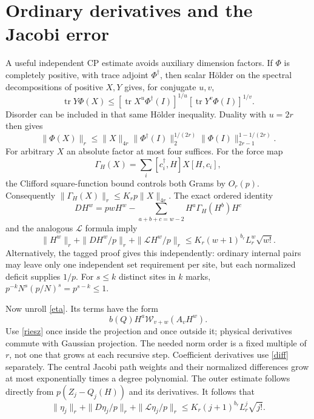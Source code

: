 \documentclass[11pt]{article}
\newcommand{\tr}{\operatorname{tr}}
\newcommand{\LL}{\mathcal L}
\newcommand{\WW}{\mathcal W}
\begin{document}
\section{Ordinary derivatives and the Jacobi error}
A useful independent CP estimate avoids auxiliary dimension factors.
If $\Phi$ is completely positive, with trace adjoint $\Phi^\dagger$,
then scalar H\"older on the spectral decompositions of positive $X,Y$
gives, for conjugate $u,v$,
\begin{equation}
 \tr Y\Phi(X)\le
 [\tr X^u\Phi^\dagger(I)]^{1/u}
 [\tr Y^v\Phi(I)]^{1/v}.
\end{equation}
Disorder can be included in that same H\"older inequality. Duality
with $u=2r$ then gives
\begin{equation}
 \|\Phi(X)\|_r\le
 \|X\|_{4r}\|\Phi^\dagger(I)\|_2^{1/(2r)}
                 \|\Phi(I)\|_{2r-1}^{1-1/(2r)}.
\end{equation}
For arbitrary $X$ an absolute factor at most four suffices.
For the force map
\begin{equation}
 \Gamma_H(X)=\sum_i[c_i^\dagger,H]X[H,c_i],
\end{equation}
the Clifford square-function bound controls both Grams by $O_r(p)$.
Consequently $\|\Gamma_H(X)\|_r\le K_rp\|X\|_{4r}$.
The exact ordered identity
\begin{equation}
 DH^w=pwH^w-
 \sum_{a+b+c=w-2}H^a\Gamma_H(H^b)H^c
\end{equation}
and the analogous $\LL$ formula imply
\begin{equation}\label{ordinaryder}
 \|H^w\|_r+\|DH^w/p\|_r+\|\LL H^w/p\|_r
 \le K_r(w+1)^{b_r}L_r^w\sqrt{w!}.
\end{equation}
Alternatively, the tagged proof gives this independently: ordinary
internal pairs may leave only one independent set requirement per
site, but each normalized deficit supplies $1/p$. For $s\le k$
distinct sites in $k$ marks, $p^{-k}N^s(p/N)^s=p^{s-k}\le1$.

Now unroll \eqref{eta}. Its terms have the form
\begin{equation}
 b(Q)H^a\WW_{v+w}(A_vH^w).
\end{equation}
Use \eqref{riesz} once inside the projection and once outside it;
physical derivatives commute with Gaussian projection. The needed
norm order is a fixed multiple of $r$, not one that grows at each
recursive step. Coefficient derivatives use \eqref{diff} separately.
The central Jacobi path weights and their normalized differences
grow at most exponentially times a degree polynomial. The outer
estimate follows directly from $p(Z_j-Q_j(H))$ and its derivatives.
It follows that
\begin{equation}\label{etader}
 \|\eta_j\|_r+\|D\eta_j/p\|_r+\|\LL\eta_j/p\|_r
 \le K_r(j+1)^{b_r}L_r^j\sqrt{j!}.
\end{equation}
\end{document}

